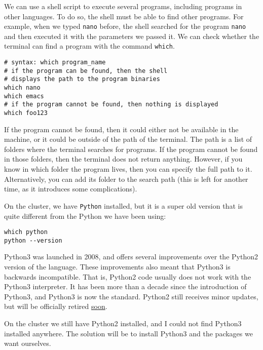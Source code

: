 \documentclass[12pt, a4paper]{article}
\begin{document}
We can use a shell script to execute several programs, including programs in other languages.
To do so, the shell must be able to find other programs.
For example, when we typed \texttt{nano} before, the shell searched for the program \texttt{nano} and then executed it with the parameters we passed it.
We can check whether the terminal can find a program with the command \texttt{which}.
\lstset{language=bash,label= ,caption= ,captionpos=b,firstnumber=1,numbers=left,style=bash}
\begin{lstlisting}
# syntax: which program_name
# if the program can be found, then the shell
# displays the path to the program binaries
which nano
which emacs
# if the program cannot be found, then nothing is displayed
which foo123
\end{lstlisting}
If the program cannot be found, then it could either not be available in the machine, or it could be outside of the path of the terminal.
The path is a list of folders where the terminal searches for programs.
If the program cannot be found in those folders, then the terminal does not return anything.
However, if you know in which folder the program lives, then you can specify the full path to it.
Alternatively, you can add its folder to the search path (this is left for another time, as it introduces some complications).

On the cluster, we have \texttt{Python} installed, but it is a super old version that is quite different from the Python we have been using:
\lstset{language=bash,label= ,caption= ,captionpos=b,firstnumber=1,numbers=left,style=bash}
\begin{lstlisting}
which python
python --version
\end{lstlisting}
Python3 was launched in 2008, and offers several improvements over the Python2 version of the language.
These improvements also meant that Python3 is backwards incompatible.
That is, Python2 code usually does not work with the Python3 interpreter.
It has been more than a decade since the introduction of Python3, and Python3 is now the standard.
Python2 still receives minor  updates, but will be officially retired \href{https://pythonclock.org}{soon}.

On the cluster we still have Python2 installed, and I could not find Python3 installed anywhere.
The solution will be to install Python3 and the packages we want ourselves.
\end{document}
